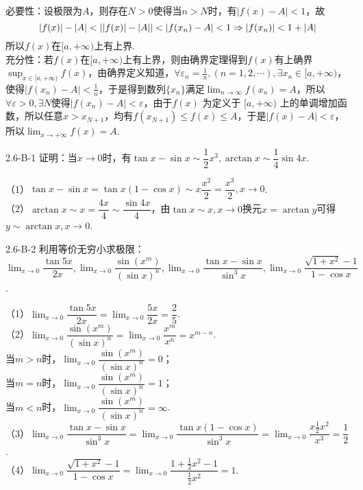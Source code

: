 \begin{solution}
    必要性：设极限为$A$，则存在$N>0$使得当$n>N$时，有$|f(x)-A|<1$，故\vspace{-10pt}
    \[|f(x)|-|A|<||f(x)|-|A||<|f(x_n)-A|<1\Rightarrow |f(x_n)|<1+|A|\vspace{-10pt}\]
    所以$f(x)$在$[a, +\infty)$上有上界.\\
    充分性：若$f(x)$在$[a, +\infty)$上有上界，则由确界定理得到$f(x)$有上确界$\sup_{x\in[a, +\infty)}f(x)$，由确界定义知道，$\forall \varepsilon_n=\frac1{n},(n=1,2,\cdots),\exists x_n\in[a,+\infty)$，使得$|f(x_n)-A|<\frac1{n}$，于是得到数列$\{x_n\}$满足$\displaystyle\lim_{n\to\infty}f(x_n)=A$，所以$\forall \varepsilon>0,\exists N$使得$|f(x_n)-A|<\varepsilon$，由于$f(x)$ 为定义于 $[a, +\infty)$ 上的单调增加函数，所以任意$x>x_{N+1}$，均有$f(x_{N+1})\leq f(x)\leq A$，于是$|f(x)-A|<\varepsilon$，所以$\displaystyle\lim_{x\to+\infty}f(x)=A$.
\end{solution}
\begin{example}{2.6-B-1}{}
    证明：当$x\to 0$时，有$\tan x-\sin x\sim \dfrac12x^3,\arctan x\sim \dfrac14\sin 4x$.
\end{example}
\begin{solution}
（1）$\tan x-\sin x=\tan x(1-\cos x)\sim x\dfrac{x^2}{2}=\dfrac{x^3}{2},x\to 0$.\\
（2）$\arctan x\sim x=\dfrac{4x}{4}\sim\dfrac{\sin 4x}{4}$，由$\tan x\sim x,x\to 0$换元$x=\arctan y$可得$y\sim\arctan x,x\to 0$.
\end{solution}
\begin{example}{2.6-B-2}{}
    利用等价无穷小求极限：$\displaystyle \lim_{x\to 0}\dfrac{\tan 5x}{2x},\lim_{x\to 0}\dfrac{\sin(x^m)}{(\sin x)^n},\lim_{x\to 0}\dfrac{\tan x-\sin x}{\sin^3 x},\lim_{x\to 0}\dfrac{\sqrt{1+x^2}-1}{1-\cos x}$.
\end{example}
\begin{solution}
    （1）$\displaystyle \lim_{x\to 0}\dfrac{\tan 5x}{2x}=\lim_{x\to 0}\dfrac{5x}{2x}=\dfrac25$.\\
    （2）$\displaystyle \lim_{x\to 0}\dfrac{\sin(x^m)}{(\sin x)^n}=\lim_{x\to 0}\dfrac{x^m}{x^n}=x^{m-n}$.\\当$m>n$时，$\lim_{x\to 0}\dfrac{\sin(x^m)}{(\sin x)^n}=0$；\\当$m=n$时，$\lim_{x\to 0}\dfrac{\sin(x^m)}{(\sin x)^n}=1$；\\当$m<n$时，$\lim_{x\to 0}\dfrac{\sin(x^m)}{(\sin x)^n}=\infty$.\\
    （3）$\displaystyle \lim_{x\to 0}\dfrac{\tan x-\sin x}{\sin^3 x}=\lim_{x\to 0}\dfrac{\tan x(1-\cos x)}{\sin^3x}=\lim_{x\to 0}\dfrac{x\frac12x^2}{x^3}=\dfrac12$.\\
    （4）$\displaystyle \lim_{x\to 0}\dfrac{\sqrt{1+x^2}-1}{1-\cos x}=\lim_{x\to 0}\dfrac{1+\frac12x^2-1}{\frac12x^2}=1$.
\end{solution}
